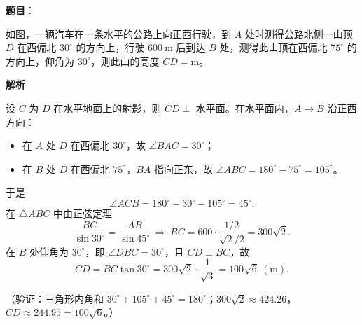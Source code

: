 \begin{answer}

\textbf{题目}：

如图，一辆汽车在一条水平的公路上向正西行驶，到 \(A\) 处时测得公路北侧一山顶 \(D\) 在西偏北 \(30^\circ\) 的方向上，行驶 \(600\ \mathrm{m}\) 后到达 \(B\) 处，测得此山顶在西偏北 \(75^\circ\) 的方向上，仰角为 \(30^\circ\)，则此山的高度 \(CD=\)\gkblank{}\(\mathrm{m}\)。
\nopagebreak[4]
\begin{center}\end{center}
\nopagebreak[4]
\textbf{解析}

设 \(C\) 为 \(D\) 在水平地面上的射影，则 \(CD\perp\) 水平面。在水平面内，\(A\to B\) 沿正西方向：

\begin{itemize}
\item 在 \(A\) 处 \(D\) 在西偏北 \(30^\circ\)，故 \(\angle BAC=30^\circ\)；
\item 在 \(B\) 处 \(D\) 在西偏北 \(75^\circ\)，\(BA\) 指向正东，故 \(\angle ABC=180^\circ-75^\circ=105^\circ\)。
\end{itemize}

于是
\nopagebreak[4]
\[
\angle ACB=180^\circ-30^\circ-105^\circ=45^\circ.
\]
在 \(\triangle ABC\) 中由正弦定理
\nopagebreak[4]
\[
\frac{BC}{\sin30^\circ}=\frac{AB}{\sin45^\circ}
\ \Longrightarrow\ BC=600\cdot\frac{1/2}{\sqrt2/2}=300\sqrt2.
\]
在 \(B\) 处仰角为 \(30^\circ\)，即 \(\angle DBC=30^\circ\)，且 \(CD\perp BC\)，故
\nopagebreak[4]
\[
CD=BC\tan30^\circ=300\sqrt2\cdot\frac{1}{\sqrt3}=100\sqrt6\ (\mathrm{m}).
\]

（验证：三角形内角和 \(30^\circ+105^\circ+45^\circ=180^\circ\)；\(300\sqrt2\approx424.26\)，\(CD\approx244.95=100\sqrt6\)。）


\end{answer}
